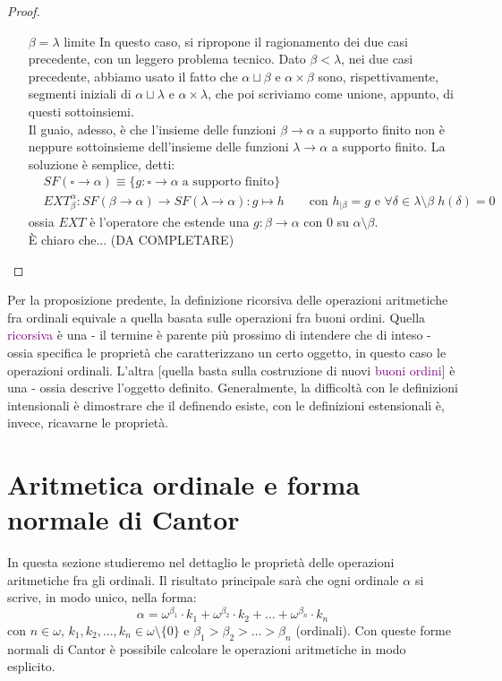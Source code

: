 \documentclass[11pt]{scrartcl}
\begin{document}
\begin{proof}
	\begin{itemize}
		\item[$\boxed{\text{$\beta = \lambda$ limite}}$] In questo caso, si ripropone il ragionamento dei due casi precedente, con un leggero problema tecnico. Dato $\beta < \lambda$, nei due casi precedente, abbiamo usato il fatto che $\alpha \sqcup \beta$ e $\alpha \times \beta$ sono,
		rispettivamente, segmenti iniziali di $\alpha \sqcup \lambda$ e $\alpha \times \lambda$, che poi scriviamo come unione, appunto, di questi sottoinsiemi.\\
		Il guaio, adesso, è che l'insieme delle funzioni $\beta \rightarrow \alpha$ a supporto finito non è neppure sottoinsieme dell'insieme delle funzioni $\lambda \rightarrow \alpha$ a supporto finito. La soluzione è semplice, detti:
		\begin{align*}
			& SF(\square \rightarrow \alpha) \equiv \{g : \square \rightarrow \alpha \; \text{a supporto finito}\} \\
			& EXT_\beta^\alpha : SF(\beta \rightarrow \alpha) \rightarrow SF(\lambda \rightarrow \alpha) : g \mapsto h \qquad\text{con $h_{|\beta} = g$ e $\forall \delta \in \lambda\setminus\beta \; h(\delta) = 0$}
		\end{align*}
		ossia $EXT$ è l'operatore che estende una $g : \beta \rightarrow \alpha$ con 0 su $\alpha \setminus\beta$.\\
		È chiaro che... (DA COMPLETARE)
	\end{itemize}
\end{proof}

Per la proposizione predente, la definizione ricorsiva delle operazioni aritmetiche fra ordinali equivale a quella basata sulle operazioni fra buoni ordini. Quella \textcolor{purple}{ricorsiva} è una  - il termine 
è parente più prossimo di intendere che di inteso - ossia specifica le proprietà che caratterizzano un certo oggetto, in questo caso le operazioni ordinali. L'altra [quella basta sulla costruzione di nuovi \textcolor{purple}{buoni ordini}] è una  -
ossia descrive l'oggetto definito. Generalmente, la difficoltà con le definizioni intensionali è dimostrare che il definendo esiste, con le definizioni estensionali è, invece, ricavarne le proprietà.

\newpage
\section{Aritmetica ordinale e forma normale di Cantor}
In questa sezione studieremo nel dettaglio le proprietà delle operazioni aritmetiche fra gli ordinali. Il risultato principale sarà che ogni ordinale $\alpha$ si scrive, in modo unico, nella forma:
\[ \alpha = \omega^{\beta_1}\cdot k_1 + \omega^{\beta_2}\cdot k_2 + \ldots + \omega^{\beta_n}\cdot k_n
	\]
con $n \in \omega$, $k_1,k_2,\ldots,k_n \in \omega\setminus\{0\}$ e $\beta_1 > \beta_2 > \ldots > \beta_n$ (ordinali). Con queste forme normali di Cantor è possibile calcolare le operazioni aritmetiche in modo esplicito.
\end{document}
